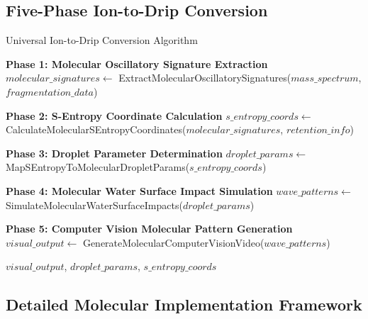 \documentclass[12pt,a4paper]{article}
\begin{document}
\subsection{Five-Phase Ion-to-Drip Conversion}

\begin{algorithm}
\caption{Universal Ion-to-Drip Conversion Algorithm}
\begin{algorithmic}[1]
    \State \textbf{Phase 1: Molecular Oscillatory Signature Extraction}
    \State $molecular\_signatures \gets$ ExtractMolecularOscillatorySignatures($mass\_spectrum$, $fragmentation\_data$)
    
    \State \textbf{Phase 2: S-Entropy Coordinate Calculation}
    \State $s\_entropy\_coords \gets$ CalculateMolecularSEntropyCoordinates($molecular\_signatures$, $retention\_info$)
    
    \State \textbf{Phase 3: Droplet Parameter Determination}  
    \State $droplet\_params \gets$ MapSEntropyToMolecularDropletParams($s\_entropy\_coords$)
    
    \State \textbf{Phase 4: Molecular Water Surface Impact Simulation}
    \State $wave\_patterns \gets$ SimulateMolecularWaterSurfaceImpacts($droplet\_params$)
    
    \State \textbf{Phase 5: Computer Vision Molecular Pattern Generation}
    \State $visual\_output \gets$ GenerateMolecularComputerVisionVideo($wave\_patterns$)
    
    \State \Return $visual\_output$, $droplet\_params$, $s\_entropy\_coords$
\EndProcedure
\end{algorithmic}
\end{algorithm}

\subsection{Detailed Molecular Implementation Framework}
\end{document}
